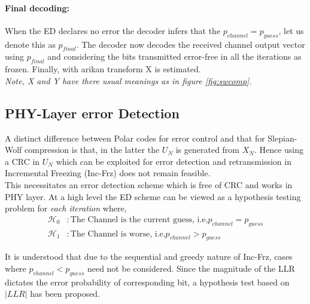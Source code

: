 \documentclass[
11pt, %
a4paper, %
oneside, %
headinclude,footinclude, %
BCOR5mm, %
]{scrartcl}
\begin{document}
\paragraph{Final decoding:}When the ED declares no error the decoder infers that the $p_{channel}=p_{guess}$, let us denote this as $p_{final}$. The decoder now  decodes the received channel output vector using $p_{final}$ and considering the bits transmitted error-free in all the iterations as frozen. Finally, with arikan transform X is estimated.
\\\emph{Note, X and Y have there usual meanings as in figure \ref{fig:swcomp}.}  


\subsection{PHY-Layer error Detection} 

A distinct difference between Polar codes for error control and that for Slepian-Wolf compression is that, in the latter the $U_N$ is generated from $X_N$. Hence using a CRC in $U_N$ which can be exploited for error detection and retransmission in Incremental Freezing (Inc-Frz) does not remain feasible.\\This necessitates an error detection scheme which is free of CRC and works in PHY layer. At a high level the ED scheme can be viewed as a hypothesis testing problem for \emph{each iteration} where,
\begin{align*}
\mathcal{H}_0 & :\text{The Channel is the current guess, i.e,} p_{channel}=p_{guess}\\
\mathcal{H}_1 & :\text{The Channel is worse, i.e,} p_{channel} > p_{guess}
\end{align*}

It is understood that due to the sequential and greedy nature of Inc-Frz, cases where $p_{channel} < p_{guess}$ need not be considered. Since the magnitude of the LLR dictates the error probability of corresponding bit, a hypothesis test based on $|LLR|$ has been proposed.
\end{document}
